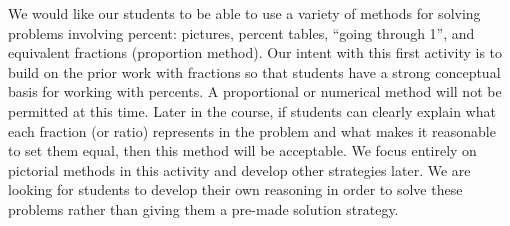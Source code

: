 \documentclass{ximera}
\begin{document}
\newpage

\begin{instructorNotes}
We would like our students to be able to use a variety of methods for solving problems involving percent: pictures, percent tables, ``going through 1'', and equivalent fractions (proportion method). Our intent with this first activity is to build on the prior work with fractions so that students have a strong conceptual basis for working with percents.  A proportional or numerical method will not be permitted at this time.  Later in the course, if students can clearly explain what each fraction (or ratio) represents in the problem and what makes it reasonable to set them equal, then this method will be acceptable.  We focus entirely on pictorial methods in this activity and develop other strategies later.   We are looking for students to develop their own reasoning in order to solve these problems rather than giving them a pre-made solution strategy. 


\end{instructorNotes}
\end{document}
